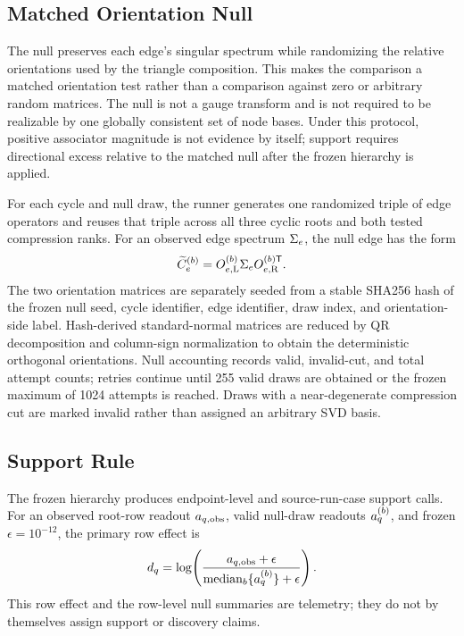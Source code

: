 \documentclass[11pt]{article}
\begin{document}
\subsection{Matched Orientation Null}

The null preserves each edge's singular spectrum while randomizing the relative
orientations used by the triangle composition. This makes the comparison a
matched orientation test rather than a comparison against zero or arbitrary
random matrices. The null is not a gauge transform and is not required to be
realizable by one globally consistent set of node bases. Under this protocol,
positive associator magnitude is not evidence by itself; support requires
directional excess relative to the matched null after the frozen hierarchy is
applied.

For each cycle and null draw, the runner generates one randomized triple of
edge operators and reuses that triple across all three cyclic roots and both
tested compression ranks. For an observed edge spectrum \(\Sigma\sb e\), the
null edge has the form
\[
\widetilde C\sb e^{(b)}=
O\sb{e,\mathrm L}^{(b)}\Sigma\sb e
O\sb{e,\mathrm R}^{(b)\mathsf T}.
\]
The two orientation matrices are separately seeded from a stable SHA256 hash of
the frozen null seed, cycle identifier, edge identifier, draw index, and
orientation-side label. Hash-derived standard-normal matrices are reduced by QR
decomposition and column-sign normalization to obtain the deterministic
orthogonal orientations. Null accounting records valid, invalid-cut, and total
attempt counts; retries continue until 255 valid draws are obtained or the
frozen maximum of 1024 attempts is reached. Draws with a near-degenerate
compression cut are marked invalid rather than assigned an arbitrary SVD basis.

\subsection{Support Rule}

The frozen hierarchy produces endpoint-level and source-run-case support calls.
For an observed root-row readout \(a\sb{q,\mathrm{obs}}\), valid null-draw
readouts \(a\sb q^{(b)}\), and frozen \(\epsilon=10^{-12}\), the primary row
effect is
\[
d\sb q=\log\!\left(
\frac{a\sb{q,\mathrm{obs}}+\epsilon}
{\operatorname{median}\sb b\{a\sb q^{(b)}\}+\epsilon}
\right).
\]
This row effect and the row-level null summaries are telemetry; they do not by
themselves assign support or discovery claims.
\end{document}
